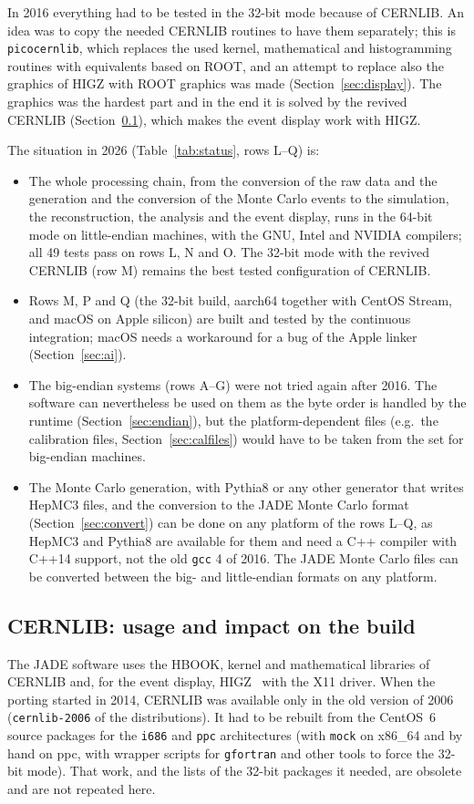 In 2016 everything had to be tested in the 32-bit mode because of CERNLIB. An idea was to copy the needed CERNLIB
routines to have them separately; this is \texttt{picocernlib}, which replaces the used kernel, mathematical and
histogramming routines with equivalents based on ROOT, and an attempt to replace also the graphics of HIGZ with
ROOT graphics was made (Section~\ref{sec:display}). The graphics was the hardest part and in the end it is
solved by the revived CERNLIB (Section~\ref{sec:cernlib}), which makes the event display work with HIGZ.

The situation in 2026 (Table~\ref{tab:status}, rows L--Q) is:
\begin{itemize}
\item The whole processing chain, from the conversion of the raw data and the generation and the conversion of the
Monte Carlo events to the simulation, the reconstruction, the analysis and the event display, runs in the 64-bit
mode on little-endian machines, with the GNU, Intel and NVIDIA compilers; all 49 tests pass on rows L, N and O.
The 32-bit mode with the revived CERNLIB (row M) remains the best tested configuration of CERNLIB.
\item Rows M, P and Q (the 32-bit build, aarch64 together with CentOS Stream, and macOS on Apple silicon) are built and tested by
the continuous integration; macOS needs a workaround for a bug of the Apple linker (Section~\ref{sec:ai}).
\item The big-endian systems (rows A--G) were not tried again after 2016. The software can nevertheless
be used on them as the byte order is handled by the runtime (Section~\ref{sec:endian}), but the
platform-dependent files (e.g.\ the calibration files, Section~\ref{sec:calfiles}) would have to be taken from the
set for big-endian machines.
\item The Monte Carlo generation, with Pythia8 or any other generator that writes HepMC3 files, and the
conversion to the JADE Monte Carlo format (Section~\ref{sec:convert}) can be done on any platform of the rows L--Q,
as HepMC3 and Pythia8 are available for them and need a C++ compiler with C++14 support, not the old
\texttt{gcc} 4 of 2016. The JADE Monte Carlo files can be converted between the big- and little-endian formats
on any platform.
\end{itemize}

\subsection{CERNLIB: usage and impact on the build}
\label{sec:cernlib}
The JADE software uses the HBOOK, kernel and mathematical libraries of CERNLIB and, for the event display, HIGZ~\cite{Couet:HIGZ}
with the X11 driver. When the porting started in 2014, CERNLIB was available only in the old version of 2006
(\texttt{cernlib-2006} of the distributions). It had to be rebuilt from the CentOS~6 source packages for the
\texttt{i686} and \texttt{ppc} architectures (with \texttt{mock} on x86\_64 and by hand on ppc, with wrapper scripts
for \texttt{gfortran} and other tools to force the 32-bit mode). That work, and the lists of the 32-bit packages it
needed, are obsolete and are not repeated here.

